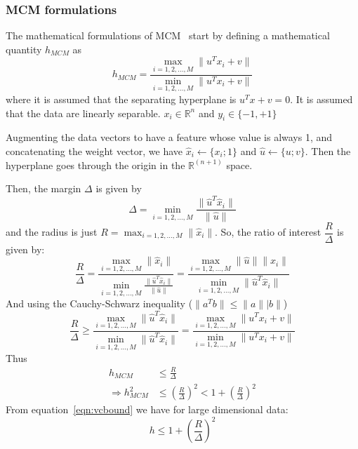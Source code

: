 \documentclass[11pt]{article}
\begin{document}
\subsubsection{MCM formulations}
The mathematical formulations of MCM~\cite{MCM} start by defining a
mathematical quantity $h_{MCM}$ as
\begin{equation}
    h_{MCM}=\frac{\max_{i=1,2,\dotsc,M}\lVert u^Tx_i+v\rVert}{\min_{i=1,2,\dotsc,M}\lVert u^Tx_i+v\rVert}
\end{equation}
where it is assumed that the separating hyperplane is $u^Tx+v=0$. It is assumed
that the data are linearly separable. $x_i\in\mathbb{R}^n$ and $y_i\in\{-1,+1\}$\par
Augmenting the data vectors to have a feature whose value is always 1, and
concatenating the weight vector, we have $\hat{x}_i\gets\{x_i;1\}$ and
$\hat{u}\gets \{u;v\}$. Then the hyperplane goes through the origin in the
$\mathbb{R}^{(n+1)}$ space.\par
Then, the margin $\Delta$ is given by
\begin{equation}
    \Delta=\min_{i=1,2,\dotsc,M}\frac{\lVert\hat{u}^T\hat{x}_i\rVert}{\lVert\hat{u}\rVert}
\end{equation}
and the radius is just $R=\max_{i=1,2,\dotsc,M}\lVert\hat{x}_i\rVert$. So, the
ratio of interest $\dfrac{R}{\Delta}$ is given by:
\begin{equation}
    \frac{R}{\Delta}=\frac{\max_{i=1,2,\dotsc,M}\lVert\hat{x}_i\rVert}{\min_{i=1,2,\dotsc,M}\frac{\lVert\hat{u}^T\hat{x}_i\rVert}{\lVert\hat{u}\rVert}}=\frac{\max_{i=1,2,\dotsc,M}\lVert\hat{u}\rVert\lVert\hat{x}_i\rVert}{\min_{i=1,2,\dotsc,M}\lVert\hat{u}^T\hat{x}_i\rVert}
\end{equation}
And using the Cauchy\nobreakdash-Schwarz inequality ($\lVert a^Tb\rVert\le\lVert
a\rVert\lvert b\rVert$)
\begin{equation}
    \frac{R}{\Delta}\ge\frac{\max_{i=1,2,\dotsc,M}\lVert\hat{u}^T\hat{x}_i\rVert}{\min_{i=1,2,\dotsc,M}\lVert\hat{u}^T\hat{x}_i\rVert}=\frac{\max_{i=1,2,\dotsc,M}\lVert u^Tx_i+v\rVert}{\min_{i=1,2,\dotsc,M}\lVert
    u^Tx_i+v\rVert}
\end{equation}
Thus
\begin{align}
    h_{MCM}&\le\frac{R}{\Delta}\\
    \Rightarrow
    h_{MCM}^2&\le\left(\frac{R}{\Delta}\right)^2<1+\left(\frac{R}{\Delta}\right)^2
\end{align}
From equation~\ref{eqn:vcbound} we have for large dimensional data:
\begin{equation}
    h\le 1+\left(\frac{R}{\Delta}\right)^2
\end{equation}
\end{document}
